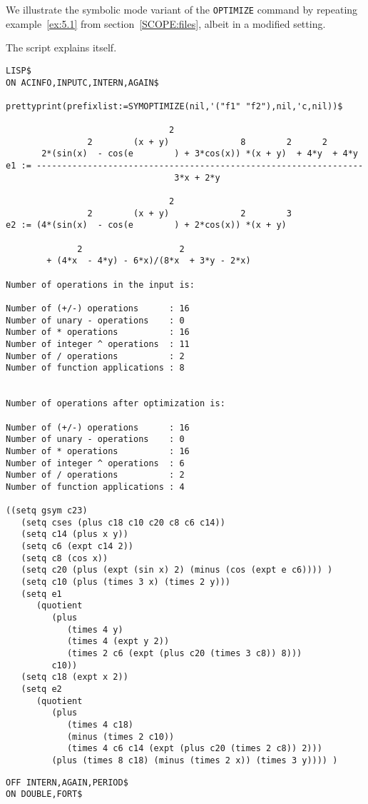 {We illustrate the symbolic mode variant of the {\tt OPTIMIZE} command by
repeating example~\ref{ex:5.1} from section~\ref{SCOPE:files}, albeit in
a modified setting.

\example\label{ex:9.1}

The script explains itself. 
{\small
\begin{verbatim}
LISP$
ON ACINFO,INPUTC,INTERN,AGAIN$

prettyprint(prefixlist:=SYMOPTIMIZE(nil,'("f1" "f2"),nil,'c,nil))$

                                2
                2        (x + y)              8        2      2
       2*(sin(x)  - cos(e        ) + 3*cos(x)) *(x + y)  + 4*y  + 4*y
e1 := ----------------------------------------------------------------
                                 3*x + 2*y

                                2
                2        (x + y)              2        3
e2 := (4*(sin(x)  - cos(e        ) + 2*cos(x)) *(x + y)

              2                   2
        + (4*x  - 4*y) - 6*x)/(8*x  + 3*y - 2*x)

Number of operations in the input is: 

Number of (+/-) operations      : 16
Number of unary - operations    : 0
Number of * operations          : 16
Number of integer ^ operations  : 11
Number of / operations          : 2
Number of function applications : 8


Number of operations after optimization is:

Number of (+/-) operations      : 16
Number of unary - operations    : 0
Number of * operations          : 16
Number of integer ^ operations  : 6
Number of / operations          : 2
Number of function applications : 4

((setq gsym c23)
   (setq cses (plus c18 c10 c20 c8 c6 c14))
   (setq c14 (plus x y))
   (setq c6 (expt c14 2))
   (setq c8 (cos x))
   (setq c20 (plus (expt (sin x) 2) (minus (cos (expt e c6)))) )
   (setq c10 (plus (times 3 x) (times 2 y)))
   (setq e1
      (quotient
         (plus
            (times 4 y)
            (times 4 (expt y 2))
            (times 2 c6 (expt (plus c20 (times 3 c8)) 8)))
         c10))
   (setq c18 (expt x 2))
   (setq e2
      (quotient
         (plus
            (times 4 c18)
            (minus (times 2 c10))
            (times 4 c6 c14 (expt (plus c20 (times 2 c8)) 2)))
         (plus (times 8 c18) (minus (times 2 x)) (times 3 y)))) )
\end{verbatim}}
{\small
\begin{verbatim}
OFF INTERN,AGAIN,PERIOD$
ON DOUBLE,FORT$


\end{verbatim}}}
